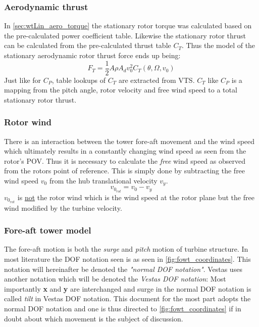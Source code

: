 \subsubsection{Aerodynamic thrust} \label{sec:wtLin_aero_thrust}
In \cref{sec:wtLin_aero_torque} the stationary rotor torque was calculated based on the pre-calculated power coefficient table. Likewise the stationary rotor thrust can be calculated from the pre-calculated thrust table $ C_T $. Thus the model of the stationary aerodynamic rotor thrust force ends up being:
\begin{equation} \label{eq:wtLin_aero_thrust}
	F_T = \dfrac{1}{2} A \rho A_d v_0^2 C_T(\theta, \Omega, v_0)
\end{equation}
Just like for $ C_P $, table lookups of $ C_T $ are extracted from VTS. $ C_T $ like $ C_P $ is a mapping from the pitch angle, rotor velocity and free wind speed to a total stationary rotor thrust.


\subsubsection{Rotor wind}
There is an interaction between the tower fore-aft movement and the wind speed which ultimately results in a constantly changing wind speed as seen from the rotor's POV. Thus it is necessary to calculate the \textit{free} wind speed as observed from the rotors point of reference. This is simply done by subtracting the free wind speed $ v_0 $ from the hub translational velocity $ v_y $.
\begin{equation}\label{eq:wtlin_comp_rotorwind}
	v_{0_{rot}} = v_{0} - v_y
\end{equation}
$ v_{0_{rot}} $ is \underline{not} the rotor wind which is the wind speed at the rotor plane but the free wind modified by the turbine velocity.


\subsubsection{Fore-aft tower model} \label{sec:mod_wtLin_foreaft_mod}
The fore-aft motion is both the \textit{surge} and \textit{pitch} motion of turbine structure. In most literature the DOF notation seen is as seen in \cref{fig:fowt_coordinates}. This notation will hereinafter be denoted the \textit{"normal DOF notation"}. Vestas uses another notation which will be denoted the \textit{Vestas DOF notation}: Most importantly \textbf{x} and \textbf{y} are interchanged and surge in the normal DOF notation is called \textit{tilt} in Vestas DOF notation. This document for the most part adopts the normal DOF notation and one is thus directed to \cref{fig:fowt_coordinates} if in doubt about which movement is the subject of discussion.

